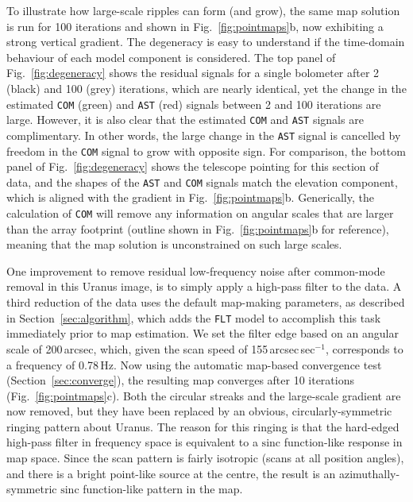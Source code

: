 \documentclass[useAMS,usenatbib,nofootinbib]{mn2e}
\def\sinc{\mathrm{sinc}}
\newcommand{\model}[1]{\texttt{#1}}
\begin{document}
To illustrate how large-scale ripples can form (and grow), the same
map solution is run for 100 iterations and shown in
Fig.~\ref{fig:pointmaps}b, now exhibiting a strong vertical
gradient. The degeneracy is easy to understand if the time-domain
behaviour of each model component is considered. The top panel of
Fig.~\ref{fig:degeneracy} shows the residual signals for a single
bolometer after 2 (black) and 100 (grey) iterations, which are nearly
identical, yet the change in the estimated \model{COM} (green) and
\model{AST} (red) signals between 2 and 100 iterations are
large. However, it is also clear that the estimated \model{COM} and
\model{AST} signals are complimentary. In other words, the large
change in the \model{AST} signal is cancelled by freedom in the
\model{COM} signal to grow with opposite sign. For comparison, the
bottom panel of Fig.~\ref{fig:degeneracy} shows the telescope pointing
for this section of data, and the shapes of the \model{AST} and
\model{COM} signals match the elevation component, which is aligned
with the gradient in Fig.~\ref{fig:pointmaps}b. Generically, the
calculation of \model{COM} will remove any information on angular
scales that are larger than the array footprint (outline shown in
Fig.~\ref{fig:pointmaps}b for reference), meaning that the map
solution is unconstrained on such large scales.

One improvement to remove residual low-frequency noise after
common-mode removal in this Uranus image, is to simply apply a
high-pass filter to the data. A third reduction of the data uses the
default map-making parameters, as described in
Section~\ref{sec:algorithm}, which adds the \model{FLT} model to
accomplish this task immediately prior to map estimation. We set the
filter edge based on an angular scale of 200\,arcsec, which, given the
scan speed of 155\,arcsec\,sec$^{-1}$, corresponds to a frequency of
0.78\,Hz. Now using the automatic map-based convergence test
(Section~\ref{sec:converge}), the resulting map converges after 10
iterations (Fig.~\ref{fig:pointmaps}c). Both the circular streaks and
the large-scale gradient are now removed, but they have been replaced
by an obvious, circularly-symmetric ringing pattern about Uranus. The
reason for this ringing is that the hard-edged high-pass filter in
frequency space is equivalent to a $\sinc$ function-like response in
map space. Since the scan pattern is fairly isotropic (scans at all
position angles), and there is a bright point-like source at the
centre, the result is an azimuthally-symmetric $\sinc$ function-like
pattern in the map.
\end{document}
